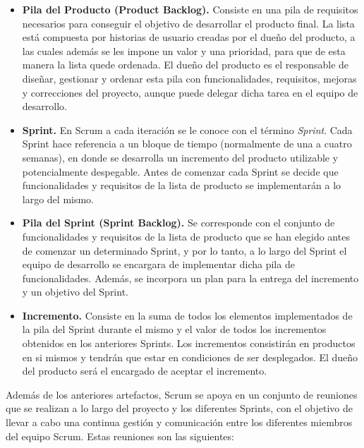 \begin{itemize}
	\item \textbf{Pila del Producto (Product Backlog).} Consiste en una pila de requisitos necesarios para conseguir el objetivo de desarrollar el producto final. La lista está compuesta por historias de usuario creadas por el dueño del producto, a las cuales además se les impone un valor y una prioridad, para que de esta manera la lista quede ordenada. El dueño del producto es el responsable de diseñar, gestionar y ordenar esta pila con funcionalidades, requisitos, mejoras y correcciones del proyecto, aunque puede delegar dicha tarea en el equipo de desarrollo.
	\item \textbf{Sprint.} En Scrum a cada iteración se le conoce con el término \emph{Sprint}. Cada Sprint hace referencia a un bloque de tiempo (normalmente de una a cuatro semanas), en donde se desarrolla un incremento del producto utilizable y potencialmente despegable. Antes de comenzar cada Sprint se decide que funcionalidades y requisitos de la lista de producto se implementarán a lo largo del mismo. 
	\item \textbf{Pila del Sprint (Sprint Backlog).} Se corresponde con el conjunto de funcionalidades y requisitos de la lista de producto que se han elegido antes de comenzar un determinado Sprint, y por lo tanto, a lo largo del Sprint el equipo de desarrollo se encargara de implementar dicha pila de funcionalidades. Además, se incorpora un plan para la entrega del incremento y un objetivo del Sprint.
	\item \textbf{Incremento.} Consiste en la suma de todos los elementos implementados de la pila del Sprint durante el mismo y el valor de todos los incrementos obtenidos en los anteriores Sprints. Los incrementos consistirán en productos en si mismos y tendrán que estar en condiciones de ser desplegados. El dueño del producto será el encargado de aceptar el incremento.
\end{itemize}

Además de los anteriores artefactos, Scrum se apoya en un conjunto de reuniones que se realizan a lo largo del proyecto y los diferentes Sprints, con el objetivo de llevar a cabo una continua gestión y comunicación entre los diferentes miembros del equipo Scrum. Estas reuniones son las siguientes:

